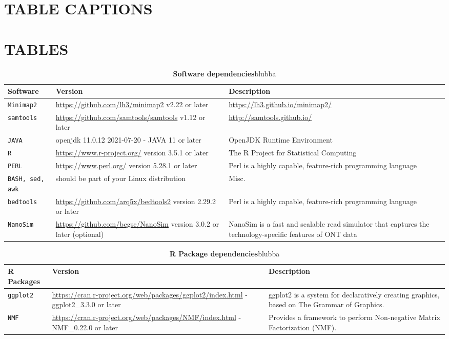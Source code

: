 \documentclass[times, 11pt, a4paper]{article}
\begin{document}
\section*{TABLE CAPTIONS}
\section*{TABLES}

\begin{table}[]
\label{tab:software}
\begin{tabular}{|p{1.5cm}|p{7cm}|p{6.5cm}|}
\hline 
            Software & Version & Description \\ 
            \hline \hline
            \texttt{Minimap2} & \url{https://github.com/lh3/minimap2} v2.22 or later & \url{https://lh3.github.io/minimap2/} \\ \hline
            \texttt{samtools} & \url{https://github.com/samtools/samtools} v1.12 or later & \url{http://samtools.github.io/} \\ \hline
	   \texttt{JAVA} & openjdk 11.0.12 2021-07-20 - JAVA 11 or later & OpenJDK Runtime Environment\\ \hline
	   \texttt{R} &  \url{https://www.r-project.org/} version 3.5.1 or later & The R Project for Statistical Computing \\ \hline
	   \texttt{PERL} &  \url{https://www.perl.org/} version 5.28.1 or later & Perl is a highly capable, feature-rich programming language \\ \hline
	   \texttt{BASH, sed, awk} &  should be part of your Linux distribution & Misc.\\ \hline
	   \texttt{bedtools} &  \url{https://github.com/arq5x/bedtools2} version 2.29.2 or later & Perl is a highly capable, feature-rich programming language \\ \hline	   
	   \texttt{NanoSim} &  \url{https://github.com/bcgsc/NanoSim} version 3.0.2 or later (optional) & NanoSim is a fast and scalable read simulator that captures the technology-specific features of ONT data\\ \hline	   
\end{tabular}
\caption{\textbf{Software dependencies}\label{tab:software} blubba}
\end{table}

\begin{table}[]
\label{tab:packages}
\begin{tabular}{|p{1.5cm}|p{7cm}|p{6.5cm}|}
\hline 
            R Packages & Version & Description \\ 
            \hline \hline
            \texttt{ggplot2} & \url{https://cran.r-project.org/web/packages/ggplot2/index.html} - ggplot2\_3.3.0 or later &  ggplot2 is a system for declaratively creating graphics, based on The Grammar of Graphics. \\ \hline
            \texttt{NMF} & \url{https://cran.r-project.org/web/packages/NMF/index.html} - NMF\_0.22.0 or later &  Provides a framework to perform Non-negative Matrix Factorization (NMF). \\ \hline
\end{tabular}
\caption{\textbf{R Package dependencies}\label{tab:software} blubba}
\end{table}
\end{document}
